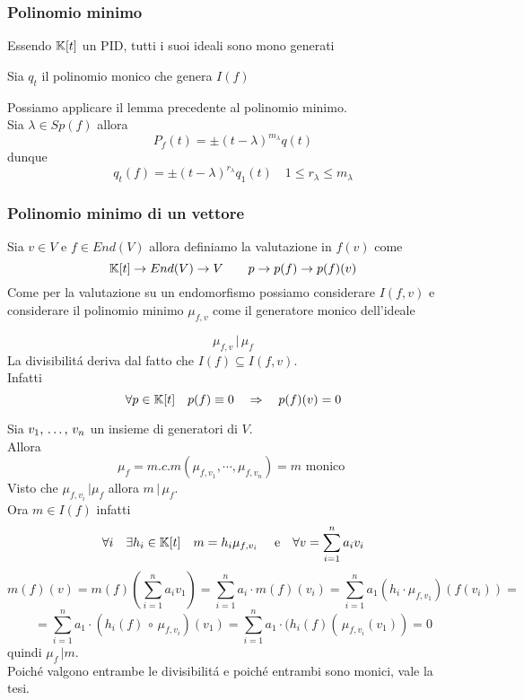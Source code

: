 \subsubsection{Polinomio minimo}
Essendo $\mathbb{K}[t]$ un PID, tutti i suoi ideali sono mono generati

\begin{defn}\bianco
Sia $q_t$ il polinomio monico che genera $I(f)$
\end{defn}
\spazio

\begin{oss} Possiamo applicare il lemma precedente al polinomio minimo.\\
Sia  $\lambda \in Sp(f) $ allora  
$$ P_f(t)=\pm ( t-\lambda)^{m_\lambda} q(t)$$
dunque 
$$q_t(f)=\pm ( t-\lambda) ^{r_\lambda } q_1(t) \quad 1 \leq r_\lambda \leq m_\lambda $$
\end{oss}
\newpage
\subsubsection{Polinomio minimo di un vettore}
Sia $v\in V $ e $f\in End(V) $ allora definiamo la valutazione in $f(v) $ come 
$$ \mathbb{K}[t] \to End(V) \to V \qquad p \to p(f) \to p(f)(v)$$
\spazio
Come per la valutazione su un endomorfismo possiamo considerare $I(f,v) $ e considerare il polinomio minimo $\mu_{f,v} $ come il generatore monico dell'ideale
\begin{lem}$$\mu_{f,v} \, \vert \, \mu_f$$
\proof
La divisibilit\'a deriva dal fatto che $ I(f)  \subseteq I(f,v)$.\\
Infatti$$\forall p \in \mathbb{K}[t] \quad p(f) \equiv 0 \quad \Rightarrow \quad  p(f)(v)=0$$
\endproof
\end{lem}
\begin{prop} \label{A}Sia $ v_1, \, \dots , \, v_n $ un insieme di generatori di $V$.\\
Allora
$$ \mu_f = m.c.m \left( \mu_{f,v_1} , \cdots, \mu_{f,v_n} \right) =m \text{ monico } $$
\proof Visto che $ \mu_{f,v_i} \, \vert \mu_f $ allora $m \, \vert \, \mu_f$.\\
Ora $ m \in I(f)$ infatti  
$$\forall i \quad \exists h_i \in \mathbb{K}[t] 
\quad m = h_i \mu_{f,v_i} \quad \text{ e}  \quad \forall v =\sum_{i=1}^n a_i v_i $$
$$m(f)(v)=m(f) \left( \sum_{i=1}^n a_i v_1 \right)= \sum_{i=1}^n a_i \cdot m(f) (v_i) = \sum_{i=1}^n a_1 \left(h_i \cdot \mu_{f,v_1} \right) (f(v_i))= $$
$$=\sum_{i=1}^n a_1 \cdot ( h_i(f) \, \circ \, \mu_{f,v_i} )(v_1)=\sum_{i=1}^n a_1 \cdot ( h_i(f) ( \, \mu_{f,v_i} (v_1))=0 $$
quindi $\mu_f \, \vert m $.\\
Poich\'e valgono  entrambe le divisibilit\'a e poich\'e entrambi sono monici, vale la tesi.
\endproof
\end{prop}
\newpage
